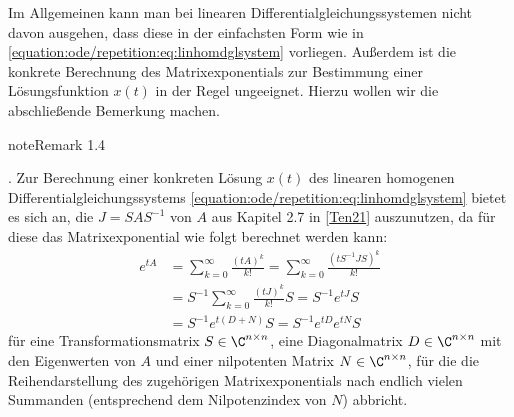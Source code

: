 \documentclass[letterpaper,10pt,english]{jupyterBook}
\begin{document}
\sphinxAtStartPar
Im Allgemeinen kann man bei linearen Differentialgleichungssystemen nicht davon ausgehen, dass diese in der einfachsten Form wie in \eqref{equation:ode/repetition:eq:linhomdglsystem} vorliegen.
Außerdem ist die konkrete Berechnung des Matrixexponentials zur Bestimmung einer Lösungsfunktion \(x(t)\) in der Regel ungeeignet.
Hierzu wollen wir die abschließende Bemerkung machen.
\label{ode/repetition:remark-16}
\begin{sphinxadmonition}{note}{Remark 1.4}



. Zur Berechnung einer konkreten Lösung \(x(t)\) des linearen homogenen Differentialgleichungssystems \eqref{equation:ode/repetition:eq:linhomdglsystem} bietet es sich an, die  \(J = SAS^{-1}\) von \(A\) aus Kapitel 2.7 in {[}\hyperlink{cite.references:id12}{Ten21}{]} auszunutzen, da für diese das Matrixexponential wie folgt berechnet werden kann:
\begin{equation*}
\begin{split}e^{tA} &=  \sum_{k=0}^\infty \frac{(t A)^k}{k!} = \sum_{k=0}^\infty \frac{(tS^{-1}JS)^k}{k!} 
\\&= 
S^{-1} \sum_{k=0}^\infty \frac{(tJ)^k}{k!} S = S^{-1} e^{tJ}S 
\\&= S^{-1} e^{t(D+N)}S = S^{-1} e^{tD} e^{tN} S\end{split}
\end{equation*}
\sphinxAtStartPar
für eine Transformationsmatrix \(S \in \C^{n \times n}\), eine Diagonalmatrix \(D \in \C^{n \times n}\) mit den Eigenwerten von \(A\) und einer nilpotenten Matrix \(N \in \C^{n \times n}\), für die die Reihendarstellung des zugehörigen Matrixexponentials nach endlich vielen Summanden (entsprechend dem Nilpotenzindex von \(N\)) abbricht.


\end{sphinxadmonition}
\end{document}
